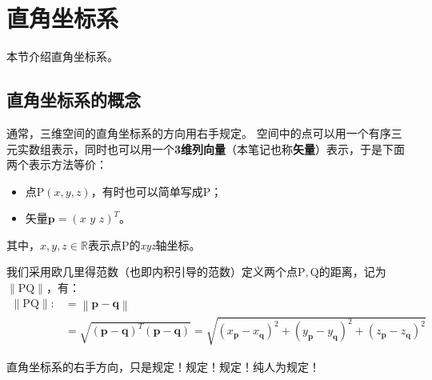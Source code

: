 \section{直角坐标系}

本节介绍直角坐标系。

\subsection{直角坐标系的概念}

通常，三维空间的直角坐标系的方向用右手规定。
空间中的点可以用一个有序三元实数组表示，同时也可以用一个{\bf 3维列向量}（本笔记也称{\bf 矢量}）表示，于是下面两个表示方法等价：
\begin{itemize}
    \item 点$\mathrm{P}\left( x,y,z \right) $，有时也可以简单写成$\mathrm{P}$；
    \item 矢量$\boldsymbol{p}=\left( x\,\,y\,\,z \right) ^T$。
\end{itemize}
其中，$x,y,z\in \mathbb{R} $表示点$\mathrm{P}$的{\it xyz}轴坐标。

我们采用欧几里得范数（也即内积引导的范数）定义两个点$\mathrm{P},\mathrm{Q}$的距离，记为$\left\| \mathrm{PQ} \right\| $，有：
\begin{align*}
\left\| \mathrm{PQ} \right\| :&=\left\| \boldsymbol{p}-\boldsymbol{q} \right\| \\
&=\sqrt{\left( \boldsymbol{p}-\boldsymbol{q} \right) ^T\left( \boldsymbol{p}-\boldsymbol{q} \right)}=\sqrt{\left( x_{\boldsymbol{p}}-x_{\boldsymbol{q}} \right) ^2+\left( y_{\boldsymbol{p}}-y_{\boldsymbol{q}} \right) ^2+\left( z_{\boldsymbol{p}}-z_{\boldsymbol{q}} \right) ^2}
\end{align*}

\begin{tcolorbox}
直角坐标系的右手方向，只是规定！规定！规定！纯人为规定！
\end{tcolorbox}




